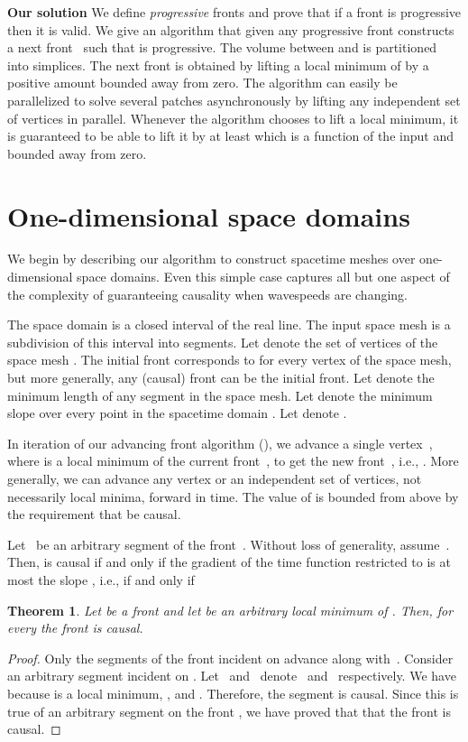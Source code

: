 \documentclass[twocolumn]{article}
\newtheorem{theorem}[lemma]{Theorem}
\begin{document}
\noindent\textbf{Our solution}
We define \emph{progressive} fronts and prove that if a front is
progressive then it is valid.  We give an algorithm that given any
progressive front  constructs a next front~ such that
 is progressive.  The volume between  and  is
partitioned into simplices.  The next front  is
obtained by lifting a local minimum of  by a positive amount
bounded away from zero.  The algorithm can easily be parallelized to
solve several patches asynchronously by lifting any independent set of
vertices in parallel.  Whenever the algorithm chooses to lift a local
minimum, it is guaranteed to be able to lift it by at least  which is a function of the input and bounded away from zero.






\section{One-dimensional space domains}
\label{sec:1d}

We begin by describing our algorithm to construct spacetime meshes
over one-dimensional space domains.  Even this simple case captures
all but one aspect of the complexity of guaranteeing causality when
wavespeeds are changing.

The space domain  is a closed interval of the real line.  The
input space mesh is a subdivision of this interval into segments.  Let
 denote the set of vertices of the space mesh .  The
initial front  corresponds to  for every vertex  of
the space mesh, but more generally, any (causal) front can be the
initial front.  Let  denote the minimum length of any segment
in the space mesh.  Let  denote the minimum slope 
over every point  in the spacetime domain .  Let  denote .

In iteration  of our advancing front algorithm (), we
advance a single vertex~, where  is a local minimum of the
current front~, to get the new front~, i.e., .  More generally, we can advance any vertex or an
independent set of vertices, not necessarily local minima, forward in
time.  The value of  is bounded from above by the
requirement that  be causal.

Let~ be an arbitrary segment of the front~. Without
loss of generality, assume~.  Then,
 is causal if and only if the gradient of the time function
 restricted to  is at most the slope , i.e.,
if and only if
  

\begin{theorem}
  Let  be a front and let  be an
  arbitrary local minimum of .  Then, for every 
  the front  is causal.
\label{thm:1d:causal}
\end{theorem}
\begin{proof}
  Only the segments of the front incident on  advance along
  with~.  Consider an arbitrary segment  incident on .
  Let~ and~ denote~ and~
  respectively.  We have  because  is a local minimum, , and .  Therefore, the segment
   is causal.  Since this is true of an arbitrary segment on
  the front , we have proved that that the front  is causal.
\end{proof}
\end{document}
